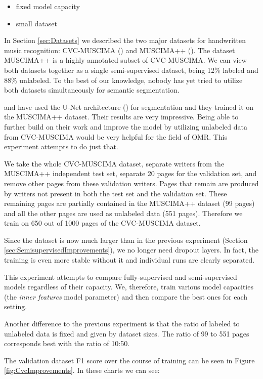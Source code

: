 \begin{itemize}
    \item fixed model capacity
    \item small dataset
\end{itemize}

In Section \ref{sec:Datasets} we described the two major datasets for handwritten music recognition: CVC-MUSCIMA (\cite{CvcMuscima}) and MUSCIMA++ (\cite{MuscimaPP}). The dataset MUSCIMA++ is a highly annotated subset of CVC-MUSCIMA. We can view both datasets together as a single semi-supervised dataset, being 12\% labeled and 88\% unlabeled. To the best of our knowledge, nobody has yet tried to utilize both datasets simultaneously for semantic segmentation.

\cite{DorferEtAl} and \cite{HajicEtAl} have used the U-Net architecture (\cite{UNet}) for segmentation and they trained it on the MUSCIMA++ dataset. Their results are very impressive. Being able to further build on their work and improve the model by utilizing unlabeled data from CVC-MUSCIMA would be very helpful for the field of OMR. This experiment attempts to do just that.

We take the whole CVC-MUSCIMA dataset, separate writers from the MUSCIMA++ independent test set, separate 20 pages for the validation set, and remove other pages from these validation writers. Pages that remain are produced by writers not present in both the test set and the validation set. These remaining pages are partially contained in the MUSCIMA++ dataset (99 pages) and all the other pages are used as unlabeled data (551 pages). Therefore we train on 650 out of 1000 pages of the CVC-MUSCIMA dataset.

Since the dataset is now much larger than in the previous experiment (Section \ref{sec:SemisupervisedImprovements}), we no longer need dropout layers. In fact, the training is even more stable without it and individual runs are clearly separated.

This experiment attempts to compare fully-supervised and semi-supervised models regardless of their capacity. We, therefore, train various model capacities (the \emph{inner features} model parameter) and then compare the best ones for each setting.

Another difference to the previous experiment is that the ratio of labeled to unlabeled data is fixed and given by dataset sizes. The ratio of 99 to 551 pages corresponds best with the ratio of 10:50.

The validation dataset F1 score over the course of training can be seen in Figure \ref{fig:CvcImprovements}. In these charts we can see:

